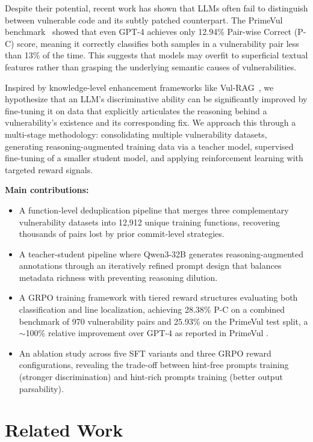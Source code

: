 \documentclass{article}
\begin{document}
Despite their potential, recent work has shown that LLMs often fail to distinguish between vulnerable code and its subtly patched counterpart. The PrimeVul benchmark~\cite{primevul} showed that even GPT-4 achieves only 12.94\% Pair-wise Correct (P-C) score, meaning it correctly classifies both samples in a vulnerability pair less than 13\% of the time. This suggests that models may overfit to superficial textual features rather than grasping the underlying semantic causes of vulnerabilities.

Inspired by knowledge-level enhancement frameworks like Vul-RAG~\cite{vul-rag}, we hypothesize that an LLM's discriminative ability can be significantly improved by fine-tuning it on data that explicitly articulates the reasoning behind a vulnerability's existence and its corresponding fix. We approach this through a multi-stage methodology: consolidating multiple vulnerability datasets, generating reasoning-augmented training data via a teacher model, supervised fine-tuning of a smaller student model, and applying reinforcement learning with targeted reward signals.

\textbf{Main contributions:}
\begin{itemize}
    \item A function-level deduplication pipeline that merges three complementary vulnerability datasets into 12,912 unique training functions, recovering thousands of pairs lost by prior commit-level strategies.
    \item A teacher-student pipeline where Qwen3-32B generates reasoning-augmented annotations through an iteratively refined prompt design that balances metadata richness with preventing reasoning dilution.
    \item A GRPO training framework with tiered reward structures evaluating both classification and line localization, achieving 28.38\% P-C on a combined benchmark of 970 vulnerability pairs and 25.93\% on the PrimeVul test split, a $\sim$100\% relative improvement over GPT-4 as reported in PrimeVul \cite{primevul}.
    \item An ablation study across five SFT variants and three GRPO reward configurations, revealing the trade-off between hint-free prompts training (stronger discrimination) and hint-rich prompts training (better output parsability).
\end{itemize}

\section{Related Work}
\end{document}
